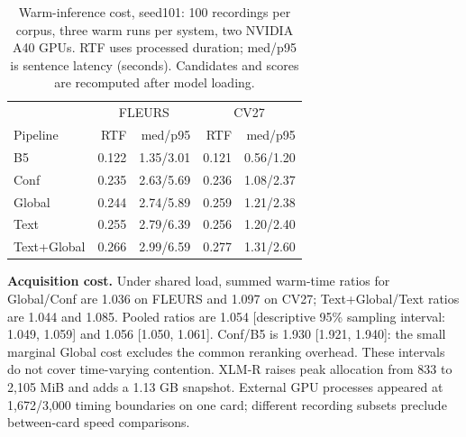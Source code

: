 \begin{table}[t]\centering\setlength{\tabcolsep}{3pt}\caption{Warm-inference cost, seed101: 100 recordings per corpus, three warm runs per system, two NVIDIA A40 GPUs. RTF uses processed duration; med/p95 is sentence latency (seconds). Candidates and scores are recomputed after model loading.}\label{tab:cost}
\begin{tabular}{lrrrr}\toprule & \multicolumn{2}{c}{FLEURS} & \multicolumn{2}{c}{CV27}\\
Pipeline & RTF & med/p95 & RTF & med/p95 \\\midrule
B5 & 0.122 & 1.35/3.01 & 0.121 & 0.56/1.20 \\
Conf & 0.235 & 2.63/5.69 & 0.236 & 1.08/2.37 \\
Global & 0.244 & 2.74/5.89 & 0.259 & 1.21/2.38 \\
Text & 0.255 & 2.79/6.39 & 0.256 & 1.20/2.40 \\
Text+Global & 0.266 & 2.99/6.59 & 0.277 & 1.31/2.60 \\
\bottomrule\end{tabular}\end{table}
\noindent\textbf{Acquisition cost.} Under shared load, summed warm-time ratios for Global/Conf are 1.036 on FLEURS and 1.097 on CV27; Text+Global/Text ratios are 1.044 and 1.085. Pooled ratios are 1.054 [descriptive 95\% sampling interval: 1.049, 1.059] and 1.056 [1.050, 1.061]. Conf/B5 is 1.930 [1.921, 1.940]: the small marginal Global cost excludes the common reranking overhead. These intervals do not cover time-varying contention. XLM-R raises peak allocation from 833 to 2{,}105 MiB and adds a 1.13 GB snapshot. External GPU processes appeared at 1{,}672/3{,}000 timing boundaries on one card; different recording subsets preclude between-card speed comparisons.
